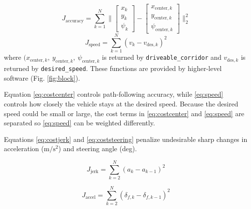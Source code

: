 \documentclass[letterpaper, 10 pt, conference]{ieeeconf}  %
\begin{document}
 \begin{equation}
 J_{\text{accuracy}} = \sum_{k=1}^N\big\| \begin{bmatrix}
 x_k\\y_k\\\psi_k
 \end{bmatrix} - \begin{bmatrix}
 x_{\text{center},k}\\y_{\text{center},k}\\\psi_{\text{center},k}
 \end{bmatrix} \big\|_2^2
 \label{eq:costcenter}
 \end{equation}
  \begin{equation}
 J_{\text{speed}} = \sum_{k=1}^N (v_k - v_{\text{des},k})^2
 \label{eq:speed}
 \end{equation}
 where $(x_{\text{center},k},\ y_{\text{center},k},\ \psi_{\text{center},k}$ is returned by \texttt{driveable\_corridor} and $v_{\text{des},k}$ is returned by \texttt{desired\_speed}. These functions are provided by higher-level software (Fig. \ref{fig:block}).
 
 
 
 Equation \eqref{eq:costcenter} controls path-following accuracy, while \eqref{eq:speed} controls how closely the vehicle stays at the desired speed. Because the desired speed could be small or large, the cost terms in \eqref{eq:costcenter} and \eqref{eq:speed} are separated so \eqref{eq:speed} can be weighted differently.
 
 
 Equations \eqref{eq:costjerk} and \eqref{eq:coststeering} penalize undesirable sharp changes in acceleration ($\text{m}/\text{s}^2$) and steering angle (deg).
 
 \begin{equation}
 J_{\text{jerk}} = \sum_{k=2}^N (a_k - a_{k-1})^2
 \label{eq:costjerk}
 \end{equation}
 
 \begin{equation}
 J_{\text{accel}} = \sum_{k=2}^N (\delta_{f,k} - \delta_{f,k-1})^2
 \label{eq:coststeering}
 \end{equation}
 
\end{document}
